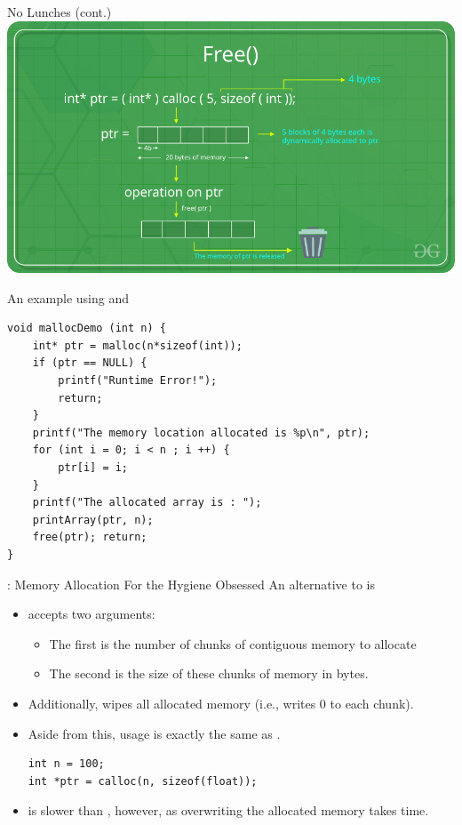 \documentclass[11pt]{beamer}
\let\OldTexttt\texttt
\renewcommand{\texttt}[1]{\OldTexttt{\color{teal}{#1}}}
\begin{document}
\begin{frame}{No \texttt{free()} Lunches (cont.)}
\center
\includegraphics[scale=0.35]{Free-function-in-c.png}
\end{frame}

\begin{frame}[fragile=singleslide]{An example using \texttt{malloc()} and \texttt{free()}}
\begin{lstlisting}[style = C]
void mallocDemo (int n) {
	int* ptr = malloc(n*sizeof(int));
	if (ptr == NULL) {
		printf("Runtime Error!"); 
		return; 
	}
	printf("The memory location allocated is %p\n", ptr);
	for (int i = 0; i < n ; i ++) { 
		ptr[i] = i; 
	}
	printf("The allocated array is : ");
	printArray(ptr, n);
	free(ptr); return;
}
\end{lstlisting}
\end{frame}

\begin{frame}[fragile=singleslide]{\texttt{calloc()} : Memory Allocation For the Hygiene Obsessed}
An alternative to \texttt{malloc()} is \texttt{calloc()}
\begin{itemize}
\item \texttt{calloc()} accepts two arguments:
\begin{itemize}
\item The first is the number of chunks of contiguous memory to allocate
\item The second is the size of these chunks of memory in bytes.  
\end{itemize}
\item Additionally, \texttt{calloc()} wipes all allocated memory (i.e., writes 0 to each chunk).
\item Aside from this, usage is exactly the same as \texttt{malloc()}.
\begin{lstlisting}[style = C]
int n = 100;
int *ptr = calloc(n, sizeof(float));
\end{lstlisting}
\item \texttt{calloc()} is slower than \texttt{malloc()}, however, as overwriting the allocated memory takes time.  
\end{itemize}
\end{frame}
\end{document}
